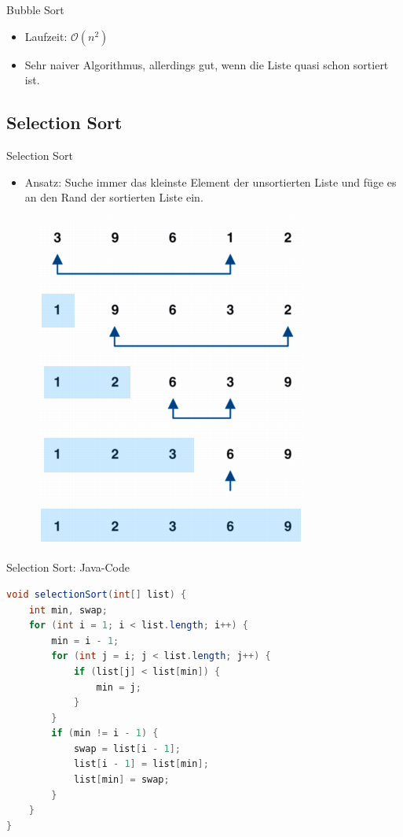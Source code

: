 \documentclass[18pt]{beamer}
\begin{document}
\begin{frame}{Bubble Sort}
    \begin{itemize}
        \item Laufzeit: $\mathcal{O}(n^2)$
        \item Sehr naiver Algorithmus, allerdings gut, wenn die Liste quasi schon sortiert ist.
    \end{itemize}
\end{frame}

\subsection{Selection Sort}

\begin{frame}{Selection Sort}
    \begin{itemize}
        \item Ansatz: Suche immer das kleinste Element der unsortierten Liste und füge es an den Rand der sortierten Liste ein.
    \end{itemize}
    \vspace{.1in}
    \begin{figure}
        \includegraphics[scale=2.6]{img/SelectionSort.png}
    \end{figure}
\end{frame}

\begin{frame}[fragile]{Selection Sort: Java-Code}
    \begin{exampleblock}{}
        \begin{lstlisting}[language=Java,basicstyle=\scriptsize]
void selectionSort(int[] list) {
    int min, swap;
    for (int i = 1; i < list.length; i++) {
        min = i - 1;
        for (int j = i; j < list.length; j++) {
            if (list[j] < list[min]) {
                min = j;
            }
        }
        if (min != i - 1) {
            swap = list[i - 1];
            list[i - 1] = list[min];
            list[min] = swap;
        }
    }
}
        \end{lstlisting}
    \end{exampleblock}
\end{frame}
\end{document}
